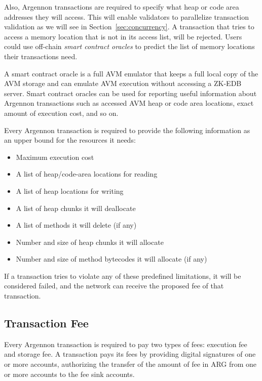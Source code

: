 Also, Argennon transactions are required to specify what heap or code area addresses they will access. This will
enable validators to parallelize transaction validation as we will see in Section~\ref{sec:concurrency}. A transaction
that tries to access a memory location that is not in its access list, will be rejected.
Users could use off-chain \emph{smart contract oracles} to predict the list of memory locations their transactions need.

A smart contract oracle is a full AVM emulator that keeps a full local copy of the AVM storage and can emulate AVM
execution without accessing a ZK-EDB server. Smart contract oracles can be used for reporting useful information about
Argennon transactions such as accessed AVM heap or code area locations, exact amount of execution cost,
and so on.

Every Argennon transaction is required to provide the following information as an upper bound for the
resources it needs:

\begin{itemize}
    \item Maximum execution cost
    \item A list of heap/code-area locations for reading
    \item A list of heap locations for writing
    \item A list of heap chunks it will deallocate
    \item A list of methods it will delete (if any)
    \item Number and size of heap chunks it will allocate
    \item Number and size of method bytecodes it will allocate (if any)
\end{itemize}

If a transaction tries to violate any of these predefined limitations, it will be considered failed, and the network
can receive the proposed fee of that transaction.

\subsection{Transaction Fee}\label{subsec:fee}

Every Argennon transaction is required to pay two types of fees: execution fee and storage fee. A transaction pays
its fees by providing digital signatures of one or more accounts, authorizing the transfer of the amount of fee in
ARG from one or more accounts to the fee sink accounts.


